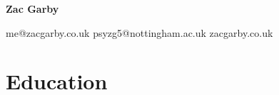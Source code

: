 \documentclass[12pt]{article}
\newcommand{\sqsep}{\quad {\tiny $\blacksquare$} \quad}
\begin{document}
\begin{center}
	{\HUGE \textbf{Zac Garby}}
	
	me@zacgarby.co.uk \sqsep
	psyzg5@nottingham.ac.uk \sqsep
	zacgarby.co.uk
\end{center}

\vspace{-1em} %

\section*{Education}
\end{document}
